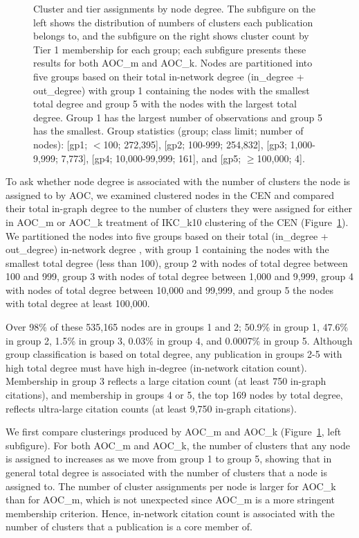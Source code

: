 \documentclass[12pt, oneside]{article}   	%
\begin{document}
\begin{figure}
\begin{subfigure}[t]{0.48\textwidth}
\end{subfigure}
\captionsetup{width=0.9\textwidth}	
\caption{Cluster and tier assignments by node degree. The subfigure on the left shows the distribution of numbers of clusters each publication belongs to, and the subfigure on the right shows cluster count by Tier 1 membership for each group; each subfigure presents these results for both AOC\_m and AOC\_k. Nodes are partitioned into five groups based on their total in-network degree (in\_degree + out\_degree) with group 1 containing the nodes with the smallest total degree and group 5 with the nodes with the largest total degree. Group 1 has the largest number of observations and group 5 has the smallest. Group statistics (group; class limit; number of nodes): [gp1; $<$100;  272,395], [gp2; 100-999; 254,832], [gp3; 1,000-9,999; 7,773], [gp4; 10,000-99,999; 161], and [gp5; $\geq$100,000; 4]. }
\label{fig:fig3}
\end{figure}
	
To ask whether node degree is associated with the number of clusters the node is assigned to by AOC, we examined clustered nodes in the CEN and compared their total in-graph degree to the number of clusters they were assigned for either in AOC\_m or AOC\_k treatment of IKC\_k10 clustering of the CEN (Figure~\ref{fig:fig3}). We partitioned the nodes into five groups based on their total (in\_degree + out\_degree) in-network degree ,  with group 1 containing the nodes with the smallest total degree (less than 100), group 2 with nodes of total degree between 100 and 999, group 3 with nodes of total degree between 1,000 and 9,999, group 4 with nodes of total degree between 10,000 and 99,999, and group 5 the nodes with total degree at least 100,000.

Over 98\% of these 535,165 nodes are in groups 1 and 2; 50.9\% in group 1, 47.6\% in group  2, 1.5\% in group 3,  0.03\% in group 4, and 0.0007\% in group 5. 
Although group classification is based on total degree,  any publication in groups 2-5 with high total degree must have high in-degree (in-network citation count). Membership in group 3  reflects a large citation count (at least 750 in-graph citations), and membership in groups 4 or 5, the top 169 nodes by total degree, reflects ultra-large citation counts (at least 9,750 in-graph citations).    
	
We first compare clusterings produced by AOC\_m and AOC\_k (Figure~\ref{fig:fig3}, left subfigure). For both AOC\_m and AOC\_k, the number of clusters that any node is assigned to increases as we move from group 1 to group 5, showing that in general total degree is associated with the number of clusters that a node is assigned to. The number of cluster assignments per node is larger for AOC\_k than for AOC\_m, which is not unexpected since AOC\_m is a more stringent membership criterion. Hence, in-network citation count is associated with the number of clusters that a publication is a core member of.
	
\end{document}
